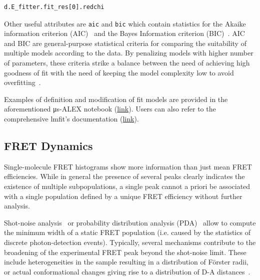 \documentclass[10pt,letterpaper]{article}
\begin{document}
\begin{lstlisting}
d.E_fitter.fit_res[0].redchi
\end{lstlisting}

Other useful attributes are \verb|aic| and \verb|bic| which contain
statistics for the Akaike information criterion (AIC)~\cite{akaike_new_1974} 
and the Bayes Information criterion (BIC)~\cite{schwarz_estimating_1978}.
AIC and BIC are general-purpose statistical criteria for comparing the
suitability of multiple models according to the data.
By penalizing models with higher number of parameters, these criteria 
strike a balance between the need of achieving high goodness of fit 
with the need of keeping the model complexity low to avoid 
overfitting~\cite{burnham_model_2002}.

Examples of definition and modification of fit models are provided in
the aforementioned μs-ALEX notebook
(\href{http://nbviewer.jupyter.org/github/tritemio/FRETBursts_notebooks/blob/master/notebooks/FRETBursts%20-%20us-ALEX%20smFRET%20burst%20analysis.ipynb#FRET-fit:-in-depth-example}{link}).
Users can also refer to the comprehensive lmfit's documentation
(\href{http://lmfit.github.io/lmfit-py/}{link}).

\subsection*{FRET Dynamics}
\label{sec:dynamics}

Single-molecule FRET histograms show more information than just mean FRET efficiencies.
While in general the presence of several peaks clearly indicates the existence of
multiple subpopulations, a single peak cannot a priori be associated with
a single population defined by a unique FRET efficiency without further analysis.

Shot-noise analysis~\cite{Nir_2006} or probability
distribution analysis (PDA)~\cite{Antonik2006,kalinin_probability_2007}
allow to compute the minimum width of a static FRET population
(i.e. caused by the statistics of discrete photon-detection events).
Typically, several mechanisms
contribute to the broadening of the experimental FRET peak
beyond the shot-noise limit. These include heterogeneities in the sample
resulting in a distribution of Förster radii,
or actual conformational changes giving rise to a distribution
of D-A distances~\cite{Sisamakis_2010}.
\end{document}
